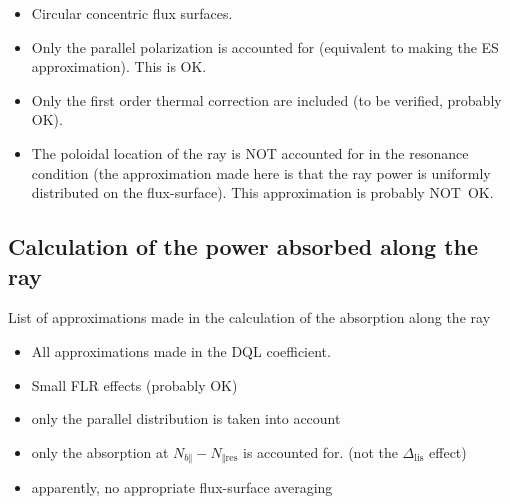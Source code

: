 \begin{itemize}
\item Circular concentric flux surfaces.

\item Only the parallel polarization is accounted for (equivalent to making
the ES approximation). This is OK.

\item Only the first order thermal correction are included (to be verified,
probably OK).

\item The poloidal location of the ray is NOT accounted for in the resonance
condition (the approximation made here is that the ray power is uniformly
distributed on the flux-surface). This approximation is probably NOT\ OK.
\end{itemize}

\subsection{\bigskip Calculation of the power absorbed along the ray}

List of approximations made in the calculation of the absorption along the ray

\begin{itemize}
\item All approximations made in the DQL coefficient.

\item Small FLR effects (probably OK)

\item only the parallel distribution is taken into account

\item only the absorption at $N_{b\Vert}-N_{\Vert\text{res}}$ is accounted
for. (not the $\Delta_{\text{lis}}$ effect)

\item apparently, no appropriate flux-surface averaging
\end{itemize}
